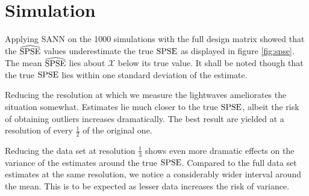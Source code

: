 \section{Simulation}
\label{sec:simulation}
	
	
	
	

	
		Applying SANN on the 1000 simulations with the full design matrix showed that the $\widehat{\mathrm{SPSE}}$ values underestimate the true $\mathrm{SPSE}$ as displayed in figure \ref{fig:spse}.
		The mean $\widehat{\mathrm{SPSE}}$ lies about $\mathcal{X}$ below its true value.
		It shall be noted though that the true $\mathrm{SPSE}$ lies within one standard deviation of the estimate.
	
	
	
		Reducing the resolution at which we measure the lightwaves ameliorates the situation somewhat.
		Estimates lie much closer to the true $\mathrm{SPSE}$, albeit the risk of obtaining outliers increases dramatically.
		The best result are yielded at a resolution of every $\frac{1}{2}$ of the original one.
	
	
	
		Reducing the data set at resolution $\frac{1}{3}$ shows even more dramatic effects on the variance of the estimates around the true $\mathrm{SPSE}$.
		Compared to the full data set estimates at the same resolution, we notice a considerably wider interval around the mean.
		This is to be expected as lesser data increases the risk of variance.
	

